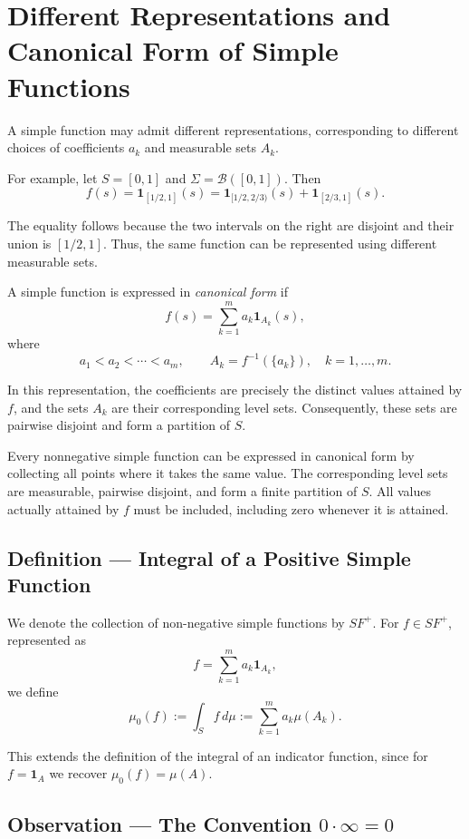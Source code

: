 \documentclass[11pt,a4paper]{article}
\begin{document}
\section*{Different Representations and Canonical Form of Simple Functions}

A simple function may admit different representations, corresponding to different choices of coefficients $a_k$ and measurable sets $A_k$.

For example, let $S=[0,1]$ and $\Sigma=\mathcal B([0,1])$. Then
\[
f(s)=\mathbf{1}_{[1/2,1]}(s)
=\mathbf{1}_{[1/2,2/3)}(s)
+\mathbf{1}_{[2/3,1]}(s).
\]

The equality follows because the two intervals on the right are disjoint and their union is $[1/2,1]$. Thus, the same function can be represented using different measurable sets.

A simple function is expressed in \emph{canonical form} if
\[
f(s)=\sum_{k=1}^{m}a_k\mathbf{1}_{A_k}(s),
\]
where
\[
a_1<a_2<\cdots<a_m,
\qquad
A_k=f^{-1}(\{a_k\}),
\quad k=1,\ldots,m.
\]

In this representation, the coefficients are precisely the distinct values attained by $f$, and the sets $A_k$ are their corresponding level sets. Consequently, these sets are pairwise disjoint and form a partition of $S$.

Every nonnegative simple function can be expressed in canonical form by collecting all points where it takes the same value. The corresponding level sets are measurable, pairwise disjoint, and form a finite partition of $S$. All values actually attained by $f$ must be included, including zero whenever it is attained.

\subsection*{Definition --- Integral of a Positive Simple Function}

We denote the collection of non-negative simple functions by $SF^+$. For $f\in SF^+$, represented as
\[
f=\sum_{k=1}^{m}a_k\mathbf{1}_{A_k},
\]
we define
\[
\mu_0(f):=\int_S f\,d\mu
:=\sum_{k=1}^{m}a_k\mu(A_k).
\]

This extends the definition of the integral of an indicator function, since for $f=\mathbf{1}_A$ we recover $\mu_0(f)=\mu(A)$.

\subsection*{Observation --- The Convention $0\cdot\infty=0$}
\end{document}
